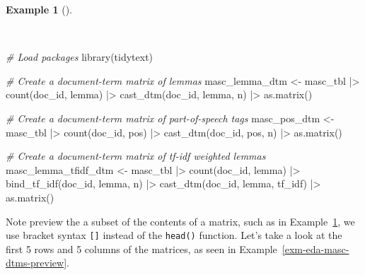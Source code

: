 \documentclass[
  letterpaper,
  DIV=11,
  numbers=noendperiod]{scrreport}
\newenvironment{Shaded}{\begin{snugshade}}{\end{snugshade}}
\newcommand{\CommentTok}[1]{\textcolor[rgb]{0.00,0.00,0.00}{\textit{#1}}}
\newcommand{\FunctionTok}[1]{\textcolor[rgb]{0.00,0.00,0.00}{#1}}
\newcommand{\NormalTok}[1]{\textcolor[rgb]{0.00,0.00,0.00}{#1}}
\newcommand{\OtherTok}[1]{\textcolor[rgb]{0.00,0.00,0.00}{#1}}
\newcommand{\SpecialCharTok}[1]{\textcolor[rgb]{0.00,0.00,0.00}{#1}}
\theoremstyle{definition}
\newtheorem{example}{Example}[chapter]
\theoremstyle{remark}
\begin{document}
\begin{example}[]\protect\hypertarget{exm-eda-masc-dtms}{}\label{exm-eda-masc-dtms}

~

\begin{Shaded}
\begin{Highlighting}[]
\CommentTok{\# Load packages}
\FunctionTok{library}\NormalTok{(tidytext)}

\CommentTok{\# Create a document{-}term matrix of lemmas}
\NormalTok{masc\_lemma\_dtm }\OtherTok{\textless{}{-}} 
\NormalTok{  masc\_tbl }\SpecialCharTok{|\textgreater{}} 
  \FunctionTok{count}\NormalTok{(doc\_id, lemma) }\SpecialCharTok{|\textgreater{}} 
  \FunctionTok{cast\_dtm}\NormalTok{(doc\_id, lemma, n) }\SpecialCharTok{|\textgreater{}} 
  \FunctionTok{as.matrix}\NormalTok{()}

\CommentTok{\# Create a document{-}term matrix of part{-}of{-}speech tags}
\NormalTok{masc\_pos\_dtm }\OtherTok{\textless{}{-}} 
\NormalTok{  masc\_tbl }\SpecialCharTok{|\textgreater{}} 
  \FunctionTok{count}\NormalTok{(doc\_id, pos) }\SpecialCharTok{|\textgreater{}} 
  \FunctionTok{cast\_dtm}\NormalTok{(doc\_id, pos, n) }\SpecialCharTok{|\textgreater{}} 
  \FunctionTok{as.matrix}\NormalTok{()}

\CommentTok{\# Create a document{-}term matrix of tf{-}idf weighted lemmas}
\NormalTok{masc\_lemma\_tfidf\_dtm }\OtherTok{\textless{}{-}} 
\NormalTok{  masc\_tbl }\SpecialCharTok{|\textgreater{}} 
  \FunctionTok{count}\NormalTok{(doc\_id, lemma) }\SpecialCharTok{|\textgreater{}} 
  \FunctionTok{bind\_tf\_idf}\NormalTok{(doc\_id, lemma, n) }\SpecialCharTok{|\textgreater{}} 
  \FunctionTok{cast\_dtm}\NormalTok{(doc\_id, lemma, tf\_idf) }\SpecialCharTok{|\textgreater{}} 
  \FunctionTok{as.matrix}\NormalTok{()}
\end{Highlighting}
\end{Shaded}

\end{example}

Note preview the a subset of the contents of a matrix, such as in
Example~\ref{exm-eda-masc-dtms}, we use bracket syntax \texttt{{[}{]}}
instead of the \texttt{head()} function. Let's take a look at the first
5 rows and 5 columns of the matrices, as seen in
Example~\ref{exm-eda-masc-dtms-preview}.
\end{document}
